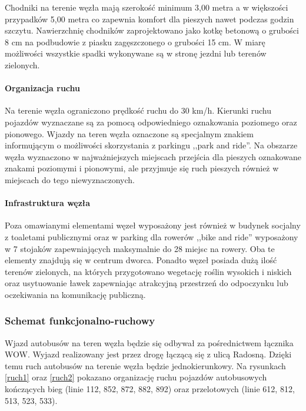 \documentclass[twoside,12pt]{article}
\begin{document}
	Chodniki na terenie węzła mają szerokość minimum 3,00 metra a w większości przypadków 5,00 metra co zapewnia komfort dla pieszych nawet podczas godzin szczytu. Nawierzchnię chodników zaprojektowano jako kotkę betonową o grubości 8 cm na podbudowie z piasku zagęszczonego o grubości 15 cm. W miarę możliwości wszystkie spadki wykonywane są w stronę jezdni lub terenów zielonych.
	
	\paragraph{Organizacja ruchu}\mbox{}
	
	Na terenie węzła ograniczono prędkość ruchu do 30 km/h. Kierunki ruchu pojazdów wyznaczane są za pomocą odpowiedniego oznakowania poziomego oraz pionowego. Wjazdy na teren węzła oznaczone są specjalnym znakiem informującym o możliwości skorzystania z parkingu ,,park and ride''. Na obszarze węzła wyznaczono w najważniejszych miejscach przejścia dla pieszych oznakowane znakami poziomymi i pionowymi, ale przyjmuje się ruch pieszych również w miejscach do tego niewyznaczonych.
	
	\paragraph{Infrastruktura węzła}\mbox{}
	
	Poza omawianymi elementami węzeł wyposażony jest również w budynek socjalny z toaletami publicznymi oraz w parking dla rowerów ,,bike and ride'' wyposażony w 7 stojaków zapewniających maksymalnie do 28 miejsc na rowery. Oba te elementy znajdują się w centrum dworca. Ponadto węzeł posiada dużą ilość terenów zielonych, na których przygotowano wegetację roślin wysokich i niskich oraz usytuowanie ławek zapewniając atrakcyjną przestrzeń do odpoczynku lub oczekiwania na komunikację publiczną. 
	
	\subsubsection{Schemat funkcjonalno-ruchowy}
	
	Wjazd autobusów na teren węzła będzie się odbywał za pośrednictwem łącznika WOW. Wyjazd realizowany jest przez drogę łączącą się z ulicą Radosną. Dzięki temu ruch autobusów na terenie węzła będzie jednokierunkowy. Na rysunkach \ref{ruch1} oraz \ref{ruch2} pokazano organizację ruchu pojazdów autobusowych kończących bieg (linie 112, 852, 872, 882, 892) oraz przelotowych (linie 612, 812, 513, 523, 533). 
	
\end{document}
